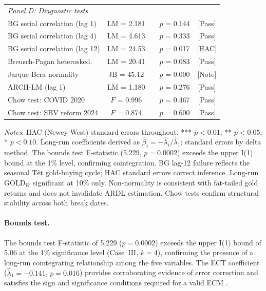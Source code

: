 \documentclass[12pt,a4paper]{article}
\begin{document}
\begin{table}[H]
\begin{tabular}{lcccc}
\midrule
\multicolumn{5}{l}{\textit{Panel D: Diagnostic tests}} \\
BG serial correlation (lag 1) & LM = 2.181 & & $p$ = 0.144 & [Pass] \\
BG serial correlation (lag 4) & LM = 4.613 & & $p$ = 0.333 & [Pass] \\
BG serial correlation (lag 12) & LM = 24.53 & & $p$ = 0.017 & [HAC] \\
Breusch-Pagan heterosked. & LM = 20.41 & & $p$ = 0.083 & [Pass] \\
Jarque-Bera normality & JB = 45.12 & & $p$ = 0.000 & [Note] \\
ARCH-LM (lag 1) & LM = 1.180 & & $p$ = 0.276 & [Pass] \\
Chow test: COVID 2020 & $F$ = 0.996 & & $p$ = 0.467 & [Pass] \\
Chow test: SBV reform 2024 & $F$ = 0.874 & & $p$ = 0.600 & [Pass] \\
\bottomrule
\end{tabular}
\begin{minipage}{\linewidth}
\vspace{4pt}
\footnotesize
\textit{Notes}: HAC (Newey-West) standard errors throughout.
*** $p<0.01$; ** $p<0.05$; * $p<0.10$.
Long-run coefficients derived as $\hat{\beta}_i = -\hat{\lambda}_i / \hat{\lambda}_1$;
standard errors by delta method.
The bounds test F-statistic (5.229, $p = 0.0002$) exceeds the upper I(1)
bound at the 1\% level, confirming cointegration. BG lag-12 failure
reflects the seasonal T\^{e}t gold-buying cycle; HAC standard errors
correct inference. Long-run GOLD$_W$ significant at 10\% only.
Non-normality is consistent with fat-tailed gold returns and does not
invalidate ARDL estimation. Chow tests confirm structural stability across
both break dates.
\end{minipage}
\end{table}

\paragraph{Bounds test.}
The bounds test F-statistic of 5.229 ($p = 0.0002$) exceeds the upper I(1)
bound of 5.06 at the 1\% significance level (Case~III, $k=4$), confirming
the presence of a long-run cointegrating relationship among the five variables.
The ECT coefficient ($\hat{\lambda}_1 = -0.141$, $p = 0.016$) provides
corroborating evidence of error correction and satisfies the sign and
significance conditions required for a valid ECM \citep{kremers1992}.
\end{document}
